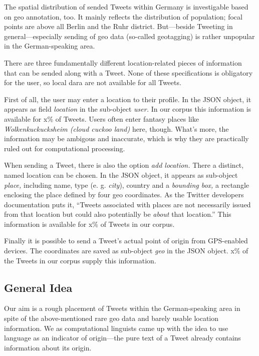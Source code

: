 \documentclass[../Main.tex]{subfiles}
\begin{document}
The spatial distribution of sended Tweets within Germany is investigable based on geo annotation, too. It mainly reflects the distribution of population; focal points are above all Berlin and the Ruhr district. But---beside Tweeting in general---especially sending of geo data (so-called geotagging) is rather unpopular in the German-speaking area.

There are three fundamentally different location-related pieces of information that can be sended along with a Tweet. None of these specifications is obligatory for the user, so local dara are not available for all Tweets.

First of all, the user may enter a location to their profile. In the JSON object, it appears as field \textit{location} in the sub-object \textit{user.} In our corpus this information is available for x\% of Tweets. Users often enter fantasy places like \textit{Wolkenkuckucksheim (cloud cuckoo land)} here, though. What's more, the information may be ambigous and inaccurate, which is why they are practically ruled out for computational processing.

When sending a Tweet, there is also the option \textit{add location.} There a distinct, named location can be chosen. In the JSON object, it appears as sub-object \textit{place,} including name, type (e. g. \textit{city}), country and a \textit{bounding box,} a rectangle enclosing the place defined by four geo coordinates. As the Twitter developers documentation puts it, ``Tweets associated with places are not necessarily issued from that location but could also potentially be \textit{about} that location.'' This information is available for x\% of Tweets in our corpus.

Finally it is possible to send a Tweet's actual point of origin from GPS-enabled devices. The coordinates are saved as sub-object \textit{geo} in the JSON object. x\% of the Tweets in our corpus supply this information.

\subsection{General Idea}
Our aim is a rough placement of Tweets within the German-speaking area in spite of the above-mentioned rare geo data and barely usable location information. We as computational linguists came up with the idea to use language as an indicator of origin---the pure text of a Tweet already contains information about its origin.
\end{document}
